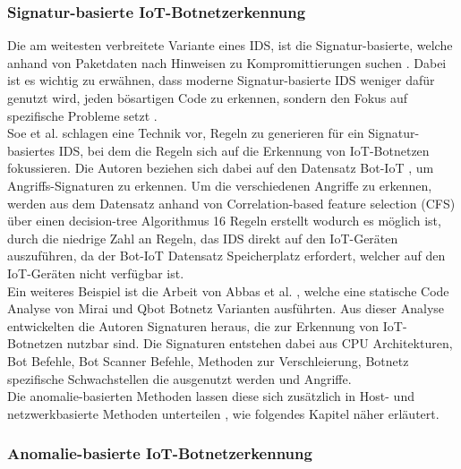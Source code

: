 \subsubsection{Signatur-basierte IoT-Botnetzerkennung}

Die am weitesten verbreitete Variante eines IDS, ist die Signatur-basierte, welche anhand von Paketdaten nach Hinweisen zu Kompromittierungen suchen \cite{SANDERS2014317}. Dabei ist es wichtig zu erwähnen, dass moderne Signatur-basierte IDS weniger dafür genutzt wird, jeden bösartigen Code zu erkennen, sondern den Fokus auf spezifische Probleme setzt \cite{DBLP:series/txcs/Kizza20}. \\[0.2in]

Soe et al. \cite{BNCSS113} schlagen eine Technik vor, Regeln zu generieren für ein Signatur-basiertes IDS, bei dem die Regeln sich auf die Erkennung von IoT-Botnetzen fokussieren. Die Autoren beziehen sich dabei auf den Datensatz Bot-IoT \cite{DBLP:journals/fgcs/KoroniotisMST19}, um Angriffs-Signaturen zu erkennen. Um die verschiedenen Angriffe zu erkennen, werden aus dem Datensatz anhand von Correlation-based feature selection (CFS) über einen decision-tree Algorithmus \cite{Ashari_2013} 16 Regeln erstellt wodurch es möglich ist, durch die niedrige Zahl an Regeln, das IDS direkt auf den IoT-Geräten auszuführen, da der Bot-IoT Datensatz Speicherplatz erfordert, welcher auf den IoT-Geräten nicht verfügbar ist. \\[0.2in]

Ein weiteres Beispiel ist die Arbeit von Abbas et al. \cite{DBLP:journals/di/AbbasHSZ21}, welche eine statische Code Analyse von Mirai und Qbot Botnetz Varianten ausführten. Aus dieser Analyse entwickelten die Autoren Signaturen heraus, die zur Erkennung von IoT-Botnetzen nutzbar sind. Die Signaturen entstehen dabei aus CPU Architekturen, Bot Befehle, Bot Scanner Befehle, Methoden zur Verschleierung, Botnetz spezifische Schwachstellen die ausgenutzt werden und Angriffe. \\ 
 Die anomalie-basierten Methoden lassen diese sich zusätzlich in Host- und netzwerkbasierte Methoden unterteilen \cite{DBLP:journals/peerj-cs/Al-mashhadiAHA21, DBLP:journals/corr/cs-CR-0406052}, wie folgendes Kapitel näher erläutert.

\subsubsection{Anomalie-basierte IoT-Botnetzerkennung}

